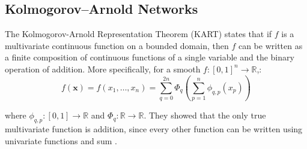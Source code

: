 \documentclass{article}
\begin{document}

\subsection{Kolmogorov–Arnold Networks}

The Kolmogorov-Arnold Representation Theorem (KART) \parencite{kolmogorov1961representation} states that if \( f \) is a multivariate continuous function on a bounded domain, then \( f \) can be written as a finite composition of continuous functions of a single variable and the binary operation of addition. More specifically, for a smooth \( f : [0,1]^n \rightarrow \mathbb{R} \),:
\begin{equation}
f(\mathbf{x}) = f(x_1, \dots, x_n) = \sum_{q=0}^{2n} \Phi_q \left( \sum_{p=1}^{n} \phi_{q,p}(x_p) \right)
\end{equation}



where \(\phi_{q,p} : [0, 1] \to \mathbb{R}\) and \(\Phi_q : \mathbb{R} \to \mathbb{R}\). They showed that the only true multivariate function is addition, since every other function can be written using univariate functions and sum \parencite{liu2024kankolmogorovarnoldnetworks}.
\end{document}
